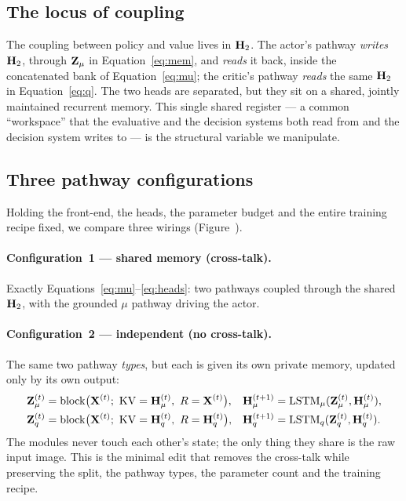 \subsection{The locus of coupling}
The coupling between policy and value lives in $\mathbf{H}_2$. The actor's pathway
\emph{writes} $\mathbf{H}_2$, through $\mathbf{Z}_\mu$ in Equation~\eqref{eq:mem}, and \emph{reads}
it back, inside the concatenated bank of Equation~\eqref{eq:mu}; the critic's
pathway \emph{reads} the same $\mathbf{H}_2$ in Equation~\eqref{eq:q}. The two heads are
separated, but they sit on a shared, jointly maintained recurrent memory. This
single shared register --- a common ``workspace'' that the evaluative and the
decision systems both read from and the decision system writes to --- is the
structural variable we manipulate.

\subsection{Three pathway configurations}
\label{sec:configs}
Holding the front-end, the heads, the parameter budget and the entire training
recipe fixed, we compare three wirings (Figure~).

\paragraph{Configuration~1 --- shared memory (cross-talk).}
Exactly Equations~\eqref{eq:mu}--\eqref{eq:heads}: two pathways coupled through the
shared $\mathbf{H}_2$, with the grounded $\mu$ pathway driving the actor.

\paragraph{Configuration~2 --- independent (no cross-talk).}
The same two pathway \emph{types}, but each is given its own private memory, updated
only by its own output:
\begin{align}
\Zmu^{(t)} &= \mathrm{block}\big(\Xt^{(t)};\ \mathrm{KV}=\Hmu^{(t)},\ R=\Xt^{(t)}\big), &
\Hmu^{(t+1)} &= \mathrm{LSTM}_\mu(\Zmu^{(t)},\Hmu^{(t)}),\\
\Zq^{(t)} &= \mathrm{block}\big(\Xt^{(t)};\ \mathrm{KV}=\HQ^{(t)},\ R=\HQ^{(t)}\big), &
\HQ^{(t+1)} &= \mathrm{LSTM}_q(\Zq^{(t)},\HQ^{(t)}).
\end{align}
The modules never touch each other's state; the only thing they share is the raw
input image. This is the minimal edit that removes the cross-talk while preserving
the split, the pathway types, the parameter count and the training recipe.

